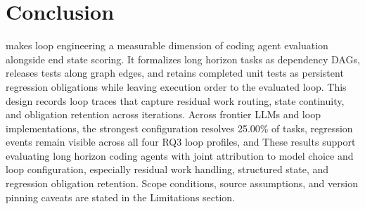\vspace{-4pt}
\section{Conclusion}\label{sec:conclusion}

\lhb{} makes loop engineering a measurable dimension of coding agent evaluation alongside end state scoring.
It formalizes long horizon tasks as dependency DAGs, releases tests along graph edges, and retains completed unit tests as persistent regression obligations while leaving execution order to the evaluated loop.
This design records loop traces that capture residual work routing, state continuity, and obligation retention across iterations.
Across frontier LLMs and loop implementations, the strongest configuration resolves 25.00\% of tasks, regression events remain visible across all four RQ3 loop profiles, and 
These results support evaluating long horizon coding agents with joint attribution to model choice and loop configuration, especially residual work handling, structured state, and regression obligation retention. Scope conditions, source assumptions, and version pinning caveats are stated in the Limitations section.
